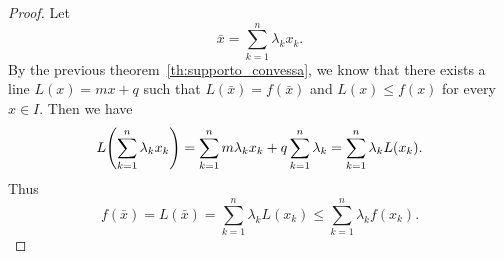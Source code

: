   \begin{proof}
  Let 
  \[
    \bar x =  \sum_{k=1}^n \lambda_k x_k.
  \]
  By the previous theorem~\ref{th:supporto_convessa}, 
  we know that there exists a line $L(x) = mx + q$ 
  such that $L(\bar x) = f(\bar x)$ 
  and $L(x)\le f(x)$ for every $x \in I$.
  Then we have 
  \[
  L {\left( \sum_{k=1}^n \lambda_k x_k \right)}
  = \sum_{k=1}^n m \lambda_k x_k + q \sum_{k=1}^n \lambda_k 
  = \sum_{k=1}^n \lambda_k L(x_k).  
  \]
  Thus 
  \[
  f(\bar x) = L(\bar x) = \sum_{k=1}^n \lambda_k L(x_k) \le 
  \sum_{k=1}^n \lambda_k f(x_k).
  \]
  \end{proof}

